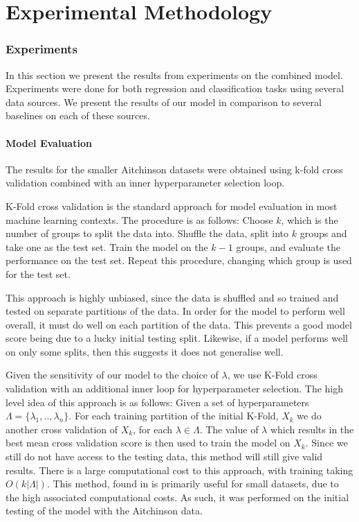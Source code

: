 \chapter{Experimental Methodology}
\label{cha:methodology}

\subsection{Experiments}
In this section we present the results from experiments on the combined model. Experiments were done for both regression and classification tasks using several data sources. We present the results of our model in comparison to several baselines on each of these sources. 

\subsubsection{Model Evaluation}
The results for the smaller Aitchinson datasets were obtained using  k-fold cross validation combined with an inner hyperparameter selection loop. 

K-Fold cross validation is the standard approach for model evaluation in most machine learning contexts. The procedure is as follows: Choose $k$, which is the number of groups to split the data into. Shuffle the data, split into $k$ groups and take one as the test set. Train the model on the $k-1$ groups, and evaluate the performance on the test set. Repeat this procedure, changing which group is used for the test set. 

This approach is highly unbiased, since the data is shuffled and so trained and tested on separate partitions of the data. In order for the model to perform well overall, it must do well on each partition of the data. This prevents a good model score being due to a lucky initial testing split. Likewise, if a model performs well on only some splits, then this suggests it does not generalise well.  

Given the sensitivity of our model to the choice of $\lambda$, we use K-Fold cross validation with an additional inner loop for hyperparameter selection. The high level idea of this approach is as follows: Given a set of hyperparameters $\Lambda = \{\lambda_1 ,.., \lambda_n\}$. For each training partition of the initial K-Fold, $X_k$ we do another cross validation of $X_k$, for each $\lambda \in \Lambda$. The value of $\lambda$ which results in the best mean cross validation score is then used to train the model on $X_k$. Since we still do not have access to the testing data, this method will still give valid results. There is a large computational cost to this approach, with training taking $O(k|\Lambda|)$. This method, found in \cite{walder} is primarily useful for small datasets, due to the high associated computational costs. As such, it was performed on the initial testing of the model with the Aitchinson data.     

